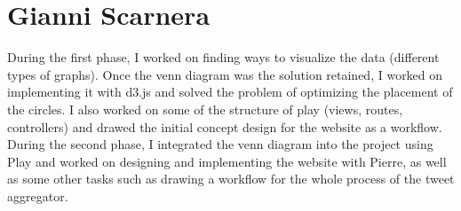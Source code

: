 \section{Gianni Scarnera}

During the first phase, I worked on finding ways to visualize the data (different types of graphs). Once the venn diagram was the solution retained, I worked on implementing it with d3.js and solved the problem of optimizing the placement of the circles. I also worked on some of the structure of play (views, routes, controllers) and drawed the initial concept design for the website as a workflow.\\
During the second phase, I integrated the venn diagram into the project using Play and worked on designing and implementing the website with Pierre, as well as some other tasks such as drawing a workflow for the whole process of the tweet aggregator.





